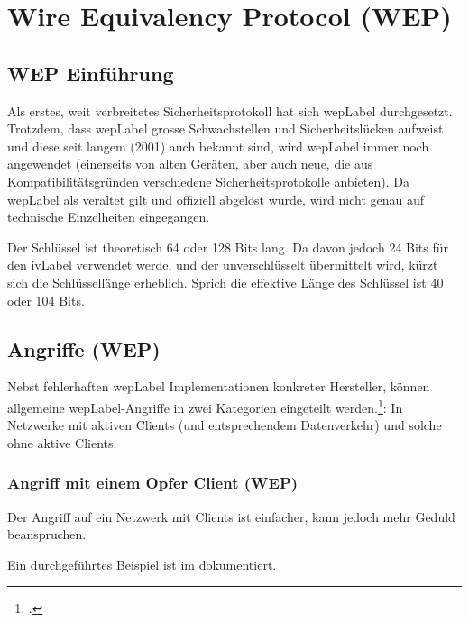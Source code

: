 \chapter{Wire Equivalency Protocol (WEP)}
\label{ch:wep}

\section{WEP Einführung}
Als erstes, weit verbreitetes Sicherheitsprotokoll hat sich \acrfull{wepLabel} durchgesetzt.
Trotzdem, dass \gls{wepLabel} grosse Schwachstellen und Sicherheitslücken aufweist und diese seit langem (2001) auch bekannt sind, wird \gls{wepLabel} immer noch angewendet (einerseits von alten Geräten, aber auch neue, die aus Kompatibilitätsgründen verschiedene Sicherheitsprotokolle anbieten).
Da \gls{wepLabel} als veraltet gilt und offiziell abgelöst wurde, wird nicht genau auf technische Einzelheiten eingegangen.

Der Schlüssel ist theoretisch 64 oder 128 Bits lang.
Da davon jedoch 24 Bits für den \gls{ivLabel} verwendet werde, und der unverschlüsselt übermittelt wird, kürzt sich die Schlüssellänge erheblich.
Sprich die effektive Länge des Schlüssel ist 40 oder 104 Bits.

\section{Angriffe (WEP)}
Nebst fehlerhaften \gls{wepLabel} Implementationen konkreter Hersteller, können allgemeine \gls{wepLabel}-Angriffe in zwei Kategorien eingeteilt werden.\footcite[][126f.]{WrightCache201503}:
In Netzwerke mit aktiven Clients (und entsprechendem Datenverkehr) und solche ohne aktive Clients.

\subsection{Angriff mit einem Opfer Client (WEP)}
Der Angriff auf ein Netzwerk mit Clients ist einfacher, kann jedoch mehr Geduld beanspruchen.

Ein durchgeführtes Beispiel ist im  dokumentiert.



